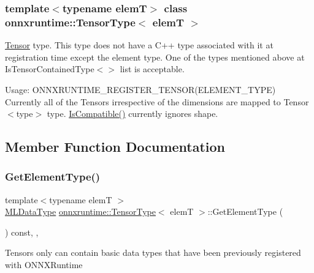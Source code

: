\subsubsection*{template$<$typename elemT$>$\newline
class onnxruntime\+::\+Tensor\+Type$<$ elem\+T $>$}

\mbox{\hyperlink{classonnxruntime_1_1Tensor}{Tensor}} type. This type does not have a C++ type associated with it at registration time except the element type. One of the types mentioned above at Is\+Tensor\+Contained\+Type$<$$>$ list is acceptable. 

Usage\+: O\+N\+N\+X\+R\+U\+N\+T\+I\+M\+E\+\_\+\+R\+E\+G\+I\+S\+T\+E\+R\+\_\+\+T\+E\+N\+S\+O\+R(\+E\+L\+E\+M\+E\+N\+T\+\_\+\+T\+Y\+P\+E) Currently all of the Tensors irrespective of the dimensions are mapped to Tensor$<$type$>$ type. \mbox{\hyperlink{classonnxruntime_1_1TensorTypeBase_a24c6755da5656503337ec14e9a4ebbf8}{Is\+Compatible()}} currently ignores shape. 

\subsection{Member Function Documentation}
\mbox{\label{classonnxruntime_1_1TensorType_a63ac5e9ac296db98f04899fde5c2221e}} 
\subsubsection{\texorpdfstring{Get\+Element\+Type()}{GetElementType()}}
{\footnotesize\ttfamily template$<$typename elemT $>$ \\
\mbox{\hyperlink{namespaceonnxruntime_ad77d0a6e838ec7da5dc35fed5ee66b49}{M\+L\+Data\+Type}} \mbox{\hyperlink{classonnxruntime_1_1TensorType}{onnxruntime\+::\+Tensor\+Type}}$<$ elemT $>$\+::Get\+Element\+Type (\begin{DoxyParamCaption}{ }\end{DoxyParamCaption}) const\hspace{0.3cm}{\ttfamily [inline]}, {\ttfamily [override]}, {\ttfamily [virtual]}}

Tensors only can contain basic data types that have been previously registered with O\+N\+N\+X\+Runtime 

